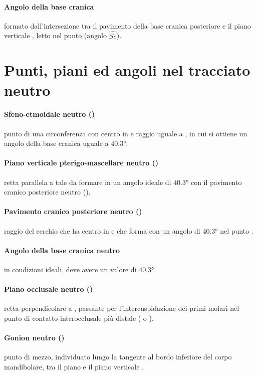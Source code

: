 \paragraph{Angolo della base cranica} formato dall'intersezione tra il pavimento della base cranica posteriore  e il piano verticale , letto nel punto  (angolo $\widehat{Se}$).
\section{Punti, piani ed angoli nel tracciato neutro}
\paragraph{Sfeno-etmoidale neutro ()} punto di una circonferenza con centro in  e raggio uguale a , in cui si ottiene un angolo della base cranica uguale a $40.3°$.
\paragraph{Piano verticale pterigo-mascellare neutro ()} retta parallela a  tale da formare in  un angolo ideale di $40.3°$ con il pavimento cranico posteriore neutro ().
\paragraph{Pavimento cranico posteriore neutro ()} raggio del cerchio che ha centro in  e che forma con  un angolo di $40.3°$ nel punto .
\paragraph{Angolo della base cranica neutro} in condizioni ideali, deve avere un valore di $40.3°$.
\paragraph{Piano occlusale neutro ()} retta perpendicolare a , passante per l'in\-ter\-cu\-spi\-da\-zio\-ne dei primi molari nel punto di contatto interocclusale più distale ( o ).
\paragraph{Gonion neutro ()} punto di mezzo, individuato lungo la tangente al bordo inferiore del corpo mandibolare, tra il piano  e il piano verticale .
